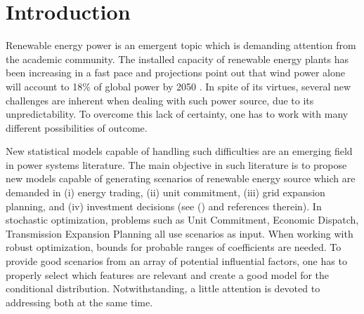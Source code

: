 \section{Introduction}


Renewable energy power is an emergent topic which is demanding attention from the academic community. %
The installed capacity of renewable energy plants has been increasing in a fast pace and projections point out that wind power alone will account to 18\% of global power by 2050  \cite{IntEnerAgency}.
In spite of its virtues, several new challenges are inherent when dealing with such power source, due to its unpredictability. To overcome this lack of certainty, one has to work with many different possibilities of outcome.

New statistical models capable of handling such difficulties are an emerging field in power systems literature\iffalse citar paper PYKA henriquinho \fi. 
The main objective in such literature is to propose new models capable of generating scenarios of renewable energy source which are demanded in (i) energy trading, (ii) unit commitment, (iii) grid expansion planning, and (iv) investment decisions (see (\cite{moreiraStreet,jabr2013robust,zhaoguan,Aderson2017}) and references therein). 
In stochastic optimization, problems such as Unit Commitment, Economic Dispatch, Transmission Expansion Planning all use scenarios as input. 
When working with robust optimization, bounds for probable ranges of coefficients are needed.
To provide good scenarios from an array of potential influential factors, one has to properly select which features are relevant and create a good model for the conditional distribution.  
Notwithstanding, a little attention is devoted to addressing both at the same time.



